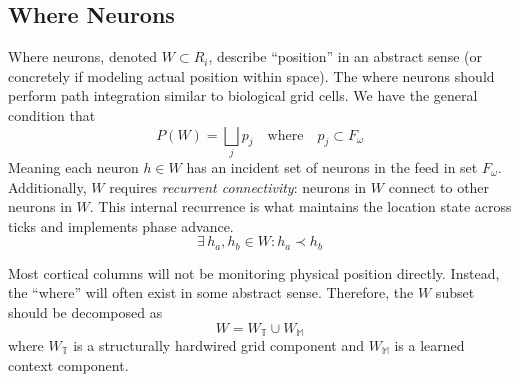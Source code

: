 \documentclass[11pt]{article}
\begin{document}
\subsection{Where Neurons}
Where neurons, denoted $W \subset R_i$, describe ``position'' in an abstract sense (or concretely if modeling actual position within space). The where neurons should perform path integration similar to biological grid cells. We have the general condition that
\begin{equation}
    P(W) = \bigsqcup_j p_j \quad \text{where} \quad p_j \subset F_\omega
\end{equation}
Meaning each neuron $h \in W$ has an incident set of neurons in the feed in set $F_\omega$. Additionally, $W$ requires \textit{recurrent connectivity}: neurons in $W$ connect to other neurons in $W$. This internal recurrence is what maintains the location state across ticks and implements phase advance.
\begin{equation}
    \exists\, h_a, h_b \in W : h_a \prec h_b
\end{equation}

Most cortical columns will not be monitoring physical position directly. Instead, the ``where'' will often exist in some abstract sense. Therefore, the $W$ subset should be decomposed as
\begin{equation}
    W = W_\mathbb{T} \cup W_\mathbb{M}
\end{equation}
where $W_\mathbb{T}$ is a structurally hardwired grid component and $W_\mathbb{M}$ is a learned context component.
\end{document}
